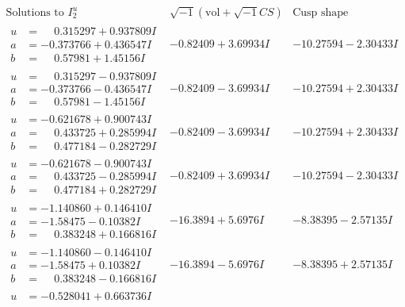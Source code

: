 \documentclass[1p]{elsarticle_modified}
\theoremstyle{definition}
\newcommand{\I}{\sqrt{-1}}
\begin{document}
$$\begin{array}{c|c|c}  
\text{Solutions to }I^u_{2}& \I (\text{vol} + \sqrt{-1}CS) & \text{Cusp shape}\\
 \hline 
\begin{aligned}
u &= \phantom{-}0.315297 + 0.937809 I \\
a &= -0.373766 + 0.436547 I \\
b &= \phantom{-}0.57981 + 1.45156 I\end{aligned}
 & -0.82409 + 3.69934 I & -10.27594 - 2.30433 I \\ \hline\begin{aligned}
u &= \phantom{-}0.315297 - 0.937809 I \\
a &= -0.373766 - 0.436547 I \\
b &= \phantom{-}0.57981 - 1.45156 I\end{aligned}
 & -0.82409 - 3.69934 I & -10.27594 + 2.30433 I \\ \hline\begin{aligned}
u &= -0.621678 + 0.900743 I \\
a &= \phantom{-}0.433725 + 0.285994 I \\
b &= \phantom{-}0.477184 - 0.282729 I\end{aligned}
 & -0.82409 - 3.69934 I & -10.27594 + 2.30433 I \\ \hline\begin{aligned}
u &= -0.621678 - 0.900743 I \\
a &= \phantom{-}0.433725 - 0.285994 I \\
b &= \phantom{-}0.477184 + 0.282729 I\end{aligned}
 & -0.82409 + 3.69934 I & -10.27594 - 2.30433 I \\ \hline\begin{aligned}
u &= -1.140860 + 0.146410 I \\
a &= -1.58475 - 0.10382 I \\
b &= \phantom{-}0.383248 + 0.166816 I\end{aligned}
 & -16.3894 + 5.6976 I & -8.38395 - 2.57135 I \\ \hline\begin{aligned}
u &= -1.140860 - 0.146410 I \\
a &= -1.58475 + 0.10382 I \\
b &= \phantom{-}0.383248 - 0.166816 I\end{aligned}
 & -16.3894 - 5.6976 I & -8.38395 + 2.57135 I \\ \hline\begin{aligned}
u &= -0.528041 + 0.663736 I \\

\end{aligned}
\end{array}$$
\end{document}

